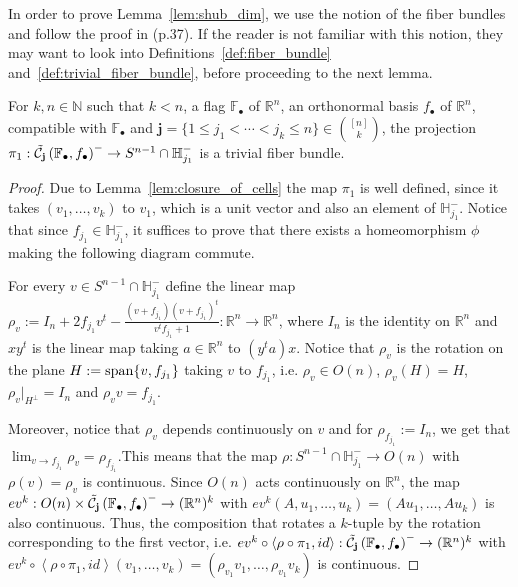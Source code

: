 In order to prove Lemma~\ref{lem:shub_dim}, we use the notion of the fiber bundles and follow the proof in \cite{vec_bundles} (p.37). If the reader is not familiar with this notion, they may want to look into Definitions~\ref{def:fiber_bundle} and~\ref{def:trivial_fiber_bundle}, before proceeding to the next lemma.
\begin{lemma}\label{lem:trivial_fb} For $k,n\in\mathbb{N}$ such that $k<n$, a flag $\mathbb{F}_{\bullet}$ of $\mathbb{R}^n$, an orthonormal basis $f_{\bullet}$ of $\mathbb{R}^n$, compatible with $\mathbb{F}_{\bullet}$ and $\mathbf{j}=\{1\leq j_1<\cdots<j_k\leq n\}\in\binom{[n]}{k}$, the projection $\pi_1:\tilde{\mathcal{C}}_{\mathbf{j}}\left(\mathbb{F}_{\bullet},f_{\bullet}\right)^-\to S^{n-1}\cap\mathbb{H}_{j_1}^-$ is a trivial fiber bundle.
\end{lemma}
\begin{proof} Due to Lemma~\ref{lem:closure_of_cells} the map $\pi_1$ is well defined, since it takes $(v_1,\ldots,v_k)$ to $v_1$, which is a unit vector and also an element of $\mathbb{H}_{j_1}^-$. Notice that since $f_{j_1}\in\mathbb{H}_{j_1}^-$, it suffices to prove that there exists a homeomorphism $\phi$ making the following diagram commute.
\begin{center}
\end{center}
For every $v\in S^{n-1}\cap\mathbb{H}_{j_1}^-$ define the linear map $\rho_v:=I_n+2f_{j_1}v^t-\frac{(v+f_{j_1})(v+f_{j_1})^t}{v^tf_{j_1}+1}:\mathbb{R}^n\to\mathbb{R}^n$, where $I_n$ is the identity on $\mathbb{R}^n$ and $xy^t$ is the linear map taking $a\in\mathbb{R}^n$ to $(y^ta)x$. Notice that $\rho_v$ is the rotation on the plane $H:=\mathrm{span}\{v,f_{j_1}\}$ taking $v$ to $f_{j_1}$, i.e. $\rho_v\in O(n)$, $\rho_v(H)=H$, $\rho_v|_{H^{\perp}}=I_n$ and $\rho_vv=f_{j_1}$.

Moreover, notice that $\rho_v$ depends continuously on $v$ and for $\rho_{f_{j_1}}:=I_n$, we get that $\lim_{v\to f_{j_1}}\rho_v=\rho_{f_{j_1}}$.This means that the map $\rho:S^{n-1}\cap\mathbb{H}_{j_1}^-\to O(n)$ with $\rho(v)=\rho_v$ is continuous. Since $O(n)$ acts continuously on $\mathbb{R}^n$, the map $ev^k:O(n)\times\tilde{\mathcal{C}}_{\mathbf{j}}\left(\mathbb{F}_{\bullet},f_{\bullet}\right)^-\to(\mathbb{R}^n)^k$ with $ev^k(A,u_1,\ldots,u_k)=(Au_1,\ldots,Au_k)$ is also continuous. Thus, the composition that rotates a $k$-tuple by the rotation corresponding to the first vector, i.e. $ev^k\circ\left<\rho\circ\pi_1,id\right>:\tilde{\mathcal{C}}_{\mathbf{j}}\left(\mathbb{F}_{\bullet},f_{\bullet}\right)^-\to(\mathbb{R}^n)^k$ with $ev^k\circ\left<\rho\circ\pi_1,id\right>(v_1,\ldots,v_k)=(\rho_{v_1}v_1,\ldots,\rho_{v_1}v_k)$ is continuous.


\end{proof}
